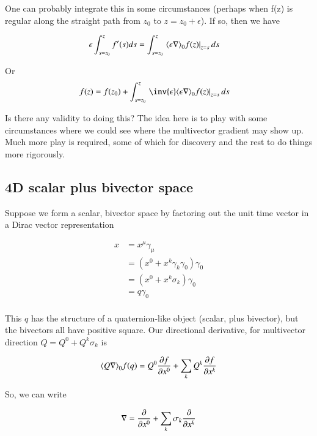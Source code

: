 \documentclass{article}
\begin{document}
One can probably integrate this in some circumstances (perhaps when f(z) is regular along the straight path from $z_0$ to $z = z_0 + \epsilon$).  If so, then we have

\begin{align*}
\epsilon \int_{s=z_0}^{z} f'(s) ds &= \int_{s=z_0}^{z} \left. \gpgradezero{ \epsilon \grad } f(z) \right\vert_{z=s} ds 
\end{align*}

Or
\begin{align*}
f(z) &= f(z_0) + \int_{s=z_0}^{z} \left. \inv{\epsilon}\gpgradezero{ \epsilon \grad } f(z) \right\vert_{z=s} ds 
\end{align*}

Is there any validity to doing this?  The idea here is to play with some circumstances where we could see 
where the multivector gradient may show up.  Much more play is required, some of which for discovery and the rest
to do things more rigorously.

\subsection{ 4D scalar plus bivector space }

Suppose we form a scalar, bivector space by factoring out the unit time vector in a Dirac vector representation

\begin{align*}
x 
&= x^\mu \gamma_\mu \\
&= \left( x^0 + x^k \gamma_k \gamma_0 \right) \gamma_0 \\
&= \left( x^0 + x^k \sigma_k \right) \gamma_0 \\
&= q \gamma_0 \\
\end{align*}

This $q$ has the structure of a quaternion-like object (scalar, plus bivector), but the bivectors all have positive square.  Our directional
derivative, for multivector direction $Q = Q^0 + Q^k \sigma_k$ is 

\begin{align*}
\gpgradezero{Q \grad} f(q) 
&= Q^0 \PD{x^0}{f} + \sum_k Q^k \PD{x^k}{f} \\
\end{align*}

So, we can write

\begin{align*}
\grad 
&= \PD{x^0}{} + \sum_k \sigma_k \PD{x^k}{} \\
\end{align*}
\end{document}
